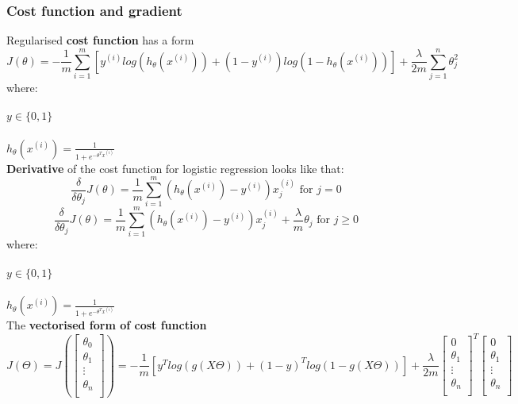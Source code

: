 \documentclass{article}
\begin{document}
\subsubsection{Cost function and gradient}
Regularised \textbf{cost function} has a form
\begin{equation}
J(\theta) = - \frac{1}{m}\sum_{i=1}^{m}[y^{(i)}log(h_{\theta}(x^{(i)}))+(1-y^{(i)})log(1-h_{\theta}(x^{(i)}))] + \frac{\lambda}{2m}\sum_{j=1}^n \theta_j^2 
\end{equation}
where:\\
\\
$y\in\{0,1\}$ \\
\\
$h_\theta(x^{(i)}) = \frac{1}{1+e^{-{\theta^Tx^{(i)}}}}$\\
\newline
\textbf{Derivative} of the cost function for logistic regression looks like that:\\
\begin{equation}
\frac{\delta}{\delta\theta_j}J(\theta) = \frac{1}{m} \sum_{i=1}^m (h_\theta(x^{(i)}) - y^{(i)}) x_j^{(i)} \text{ for } j=0
\end{equation}
\begin{equation}
\frac{\delta}{\delta\theta_j}J(\theta) = \frac{1}{m} \sum_{i=1}^m (h_\theta(x^{(i)}) - y^{(i)}) x_j^{(i)} + \dfrac{\lambda}{m}\theta_j \text{ for } j\ge0
\end{equation}
where:\\
\\
$y\in\{0,1\}$ \\
\\
$h_\theta(x^{(i)}) = \frac{1}{1+e^{-{\theta^Tx^{(i)}}}}$\\
\newline
The \textbf{vectorised form of cost function} 
\newline
\color{red}
\begin{equation}
J(\Theta) =  J\left( \begin{bmatrix} 
\theta_0 \\ 
\theta_1 \\
\vdots \\
\theta_n\\
\end{bmatrix} \right) = - \frac{1}{m} \left[ y^T log(g(X\Theta)) + (1-y)^T log(1-g(X\Theta)) \right] +  \frac{\lambda}{2m}
\begin{bmatrix} 
0 \\ 
\theta_1 \\
\vdots \\
\theta_n\\
\end{bmatrix}^T
\begin{bmatrix} 
0 \\ 
\theta_1 \\
\vdots \\
\theta_n\\
\end{bmatrix}
\end{equation}\\
\end{document}
